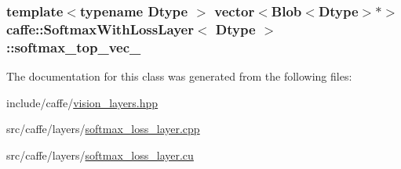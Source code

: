 \hypertarget{classcaffe_1_1_softmax_with_loss_layer_a0fd219e185b46acce8fd74cb71dabf44}{
\subsubsection[{softmax\+\_\+top\+\_\+vec\+\_\+}]{\setlength{\rightskip}{0pt plus 5cm}template$<$typename Dtype $>$ vector$<${\bf Blob}$<$Dtype$>$$\ast$$>$ {\bf caffe\+::\+Softmax\+With\+Loss\+Layer}$<$ Dtype $>$\+::softmax\+\_\+top\+\_\+vec\+\_\+\hspace{0.3cm}{\ttfamily [protected]}}}\label{classcaffe_1_1_softmax_with_loss_layer_a0fd219e185b46acce8fd74cb71dabf44}


The documentation for this class was generated from the following files\+:\begin{DoxyCompactItemize}
\item 
include/caffe/\hyperlink{vision__layers_8hpp}{vision\+\_\+layers.\+hpp}\item 
src/caffe/layers/\hyperlink{softmax__loss__layer_8cpp}{softmax\+\_\+loss\+\_\+layer.\+cpp}\item 
src/caffe/layers/\hyperlink{softmax__loss__layer_8cu}{softmax\+\_\+loss\+\_\+layer.\+cu}\end{DoxyCompactItemize}
